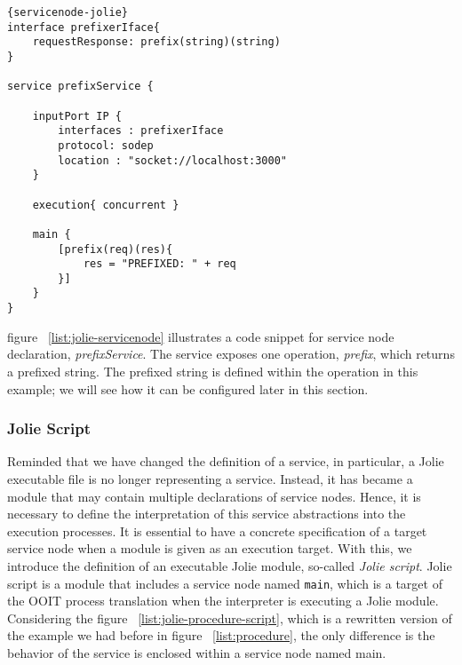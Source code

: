 \begin{listing}[ht]

    \lstset{language=Jolie,
        style=codeStyle,
        numbers=left,
        firstnumber=1
    }
    \begin{lstlisting}[frame=tlrb]{servicenode-jolie}
interface prefixerIface{
    requestResponse: prefix(string)(string)
}

service prefixService {
    
    inputPort IP {
        interfaces : prefixerIface
        protocol: sodep
        location : "socket://localhost:3000"
    }

    execution{ concurrent }

    main {
        [prefix(req)(res){
            res = "PREFIXED: " + req
        }]
    }
}
    \end{lstlisting}
    \caption{Jolie implemenation of service node}
    \label{list:jolie-servicenode}
\end{listing}

figure ~\ref{list:jolie-servicenode} illustrates a code snippet for service node declaration, \textit{prefixService}. The service exposes one operation, \textit{prefix}, which returns a prefixed string. The prefixed string is defined within the operation in this example; we will see how it can be configured later in this section.

\FloatBarrier

\subsubsection*{Jolie Script}

Reminded that we have changed the definition of a service, in particular, a Jolie executable file is no longer representing a service. Instead, it has became a module that may contain multiple declarations of service nodes. Hence, it is necessary to define the interpretation of this service abstractions into the execution processes.
It is essential to have a concrete specification of a target service node when a module is given as an execution target.
With this, we introduce the definition of an executable Jolie module, so-called \textit{Jolie script}.
Jolie script is a module that includes a service node named \texttt{main}, which is a target of the OOIT process translation when the interpreter is executing a Jolie module. Considering the figure ~\ref{list:jolie-procedure-script}, which is a rewritten version of the example we had before in figure ~\ref{list:procedure}, the only difference is the behavior of the service is enclosed within a service node named main. 

